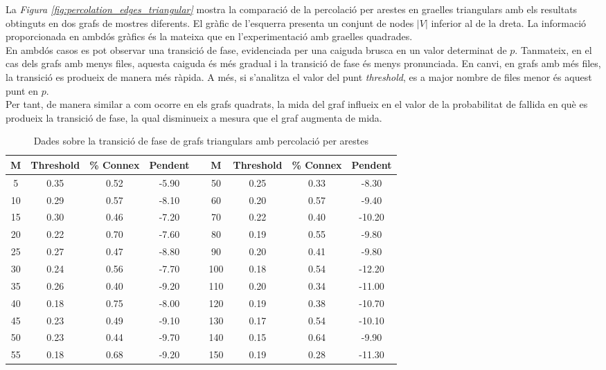 \documentclass[a4paper]{article}
\begin{document}
	La \textit{Figura \ref{fig:percolation_edges_triangular}} mostra la comparació de la percolació per arestes en graelles triangulars amb els resultats obtinguts en dos grafs de mostres diferents. El gràfic de l'esquerra presenta un conjunt de nodes $|V|$ inferior al de la dreta. La informació proporcionada en ambdós gràfics és la mateixa que en l'experimentació amb graelles quadrades. \\
	
	En ambdós casos es pot observar una transició de fase, evidenciada per una caiguda brusca en un valor determinat de $p$. Tanmateix, en el cas dels grafs amb menys files, aquesta caiguda és més gradual i la transició de fase és menys pronunciada. En canvi, en grafs amb més files, la transició es produeix de manera més ràpida. A més, si s'analitza el valor del punt \textit{threshold}, es a major nombre de files menor és aquest punt en $p$. \\
	
	Per tant, de manera similar a com ocorre en els grafs quadrats, la mida del graf influeix en el valor de la probabilitat de fallida en què es produeix la transició de fase, la qual disminueix a mesura que el graf augmenta de mida. \\
	
	\begin{table}[H]
		\centering
		\begin{tabular}{|c|c|c|c|c|c|c|c|c|}
			\hline
			\rowcolor{gray!30}
			M & Threshold & \% Connex & Pendent &   & M & Threshold & \% Connex & Pendent \\ \hline
			5 & 0.35 & 0.52 & -5.90  &   & 50 & 0.25 & 0.33 & -8.30 \\ \hline
			10 & 0.29 & 0.57 & -8.10 &   & 60 & 0.20 & 0.57 & -9.40 \\ \hline
			15 & 0.30 & 0.46 & -7.20 &   & 70 & 0.22 & 0.40 & -10.20 \\ \hline
			20 & 0.22 & 0.70 & -7.60 &   & 80 & 0.19 & 0.55 & -9.80 \\ \hline
			25 & 0.27 & 0.47 & -8.80 &   & 90 & 0.20 & 0.41 & -9.80 \\ \hline
			30 & 0.24 & 0.56 & -7.70 &   & 100 & 0.18 & 0.54 & -12.20 \\ \hline
			35 & 0.26 & 0.40 & -9.20 &   & 110 & 0.20 & 0.34 & -11.00 \\ \hline
			40 & 0.18 & 0.75 & -8.00 &   & 120 & 0.19 & 0.38 & -10.70 \\ \hline
			45 & 0.23 & 0.49 & -9.10 &   & 130 & 0.17 & 0.54 & -10.10 \\ \hline
			50 & 0.23 & 0.44 & -9.70 &   & 140 & 0.15 & 0.64 & -9.90 \\ \hline
			55 & 0.18 & 0.68 & -9.20 &   & 150 & 0.19 & 0.28 & -11.30 \\ \hline
			
		\end{tabular}
		\caption{Dades sobre la transició de fase de grafs triangulars amb percolació per arestes}
		\label{tab:data_edges_triangulars}
	\end{table}
	
\end{document}
